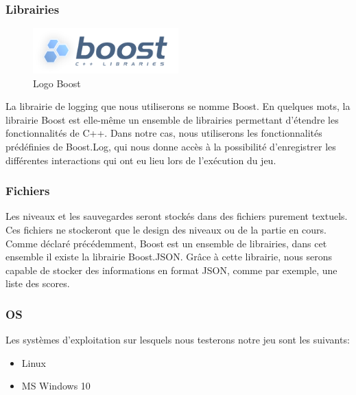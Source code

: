 \subsubsection{Librairies}
\begin{figure}[h]
	\centering
	\includegraphics[width=0.5\textwidth]{pictures/Boost_logo.png}
	\caption{Logo Boost}
	\label{fig:logo_boost}
\end{figure}
La librairie de logging que nous utiliserons se nomme Boost. En quelques mots, la librairie Boost est elle-même un ensemble de librairies permettant d'étendre les fonctionnalités de C++. Dans notre cas, nous utiliserons les fonctionnalités prédéfinies de Boost.Log, qui nous donne accès à la possibilité d'enregistrer les différentes interactions qui ont eu lieu lors de l'exécution du jeu.

\subsubsection{Fichiers}
Les niveaux et les sauvegardes seront stockés dans des fichiers purement textuels. Ces fichiers ne stockeront que le design des niveaux ou de la partie en cours.
Comme déclaré précédemment, Boost est un ensemble de librairies, dans cet ensemble il existe la librairie Boost.JSON. Grâce à cette librairie, nous serons capable de stocker des informations en format JSON, comme par exemple, une liste des scores.

\subsubsection{OS}
Les systèmes d'exploitation sur lesquels nous testerons notre jeu sont les suivants:
\begin{itemize}
	\item Linux
	\item MS Windows 10
	\end{itemize}
